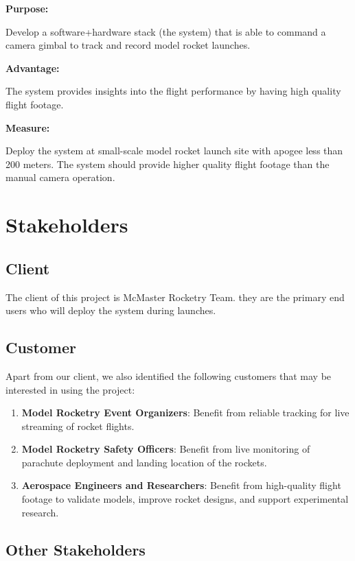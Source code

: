 \documentclass[12pt]{article}
\begin{document}
\textbf{Purpose:}

Develop a software+hardware stack (the system) that is able to command a camera
gimbal to track and record model rocket launches.

\textbf{Advantage:}

The system provides insights into the flight performance by having high quality
flight footage.

\textbf{Measure:}

Deploy the system at small-scale model rocket launch site with apogee less than
200 meters. The system should provide higher quality flight footage than the
manual camera operation.

\section{Stakeholders}

\subsection{Client}

The client of this project is McMaster Rocketry Team. they are the primary end
users who will deploy the system during launches.

\subsection{Customer}

Apart from our client, we also identified the following customers that may be
interested in using the project:

\begin{enumerate}
  \item \textbf{Model Rocketry Event Organizers}: Benefit from
        reliable tracking for live streaming of rocket flights.
  \item \textbf{Model Rocketry Safety Officers}: Benefit from
        live monitoring of parachute deployment and landing location
        of the rockets.
  \item \textbf{Aerospace Engineers and Researchers}: Benefit from
        high-quality flight footage to validate models, improve rocket
        designs, and support experimental research.
\end{enumerate}

\subsection{Other Stakeholders}
\end{document}
